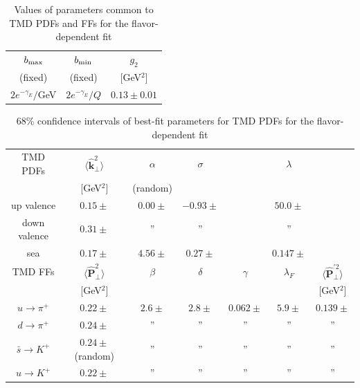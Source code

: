 \documentclass[aps,preprintnumbers,showpacs,nofootinbib,superscriptaddress,floatfix]{revtex4}
\newcommand{\T}{\perp}
\begin{document}
\begin{table}
\small
  \centering
  \begin{tabular}{|c|c|c|}
\hline
\hline
$b_{\rm max}$ & $b_{\rm min}$ &  $g_2$ 
 \\ 
 (fixed)     & (fixed)   & {[GeV$^2$]}                           \\
\hline
$2 e^{-\gamma_E}/$GeV& $2 e^{-\gamma_E}/Q$  & $0.13 \pm 0.01$  \\
\hline
\hline
\end{tabular}
\caption{Values of parameters common to TMD PDFs and FFs 
for the flavor-dependent fit}
\label{t:parcommon_flav}
\end{table}



\begin{table}
\small
  \centering
  \begin{tabular}{|c||c|c|c|c|c|c|}
\hline
\hline
TMD PDFs&  $\big \langle \hat{\bm{k}}_{\T}^2 \big \rangle$ 
& $\alpha$ & $\sigma$ & & $\lambda$ &  
 \\ 
        & {[GeV$^2$]}                               &
      (random) &      &  & & \\
\hline
up valence 
& $0.15 \pm  $ & $0.00 \pm   $ & $-0.93 \pm  $  &  & $50.0 \pm  $ &
\\
\hline
down valence 
& $0.31 \pm  $ & '' & ''  &  & '' &    \\
\hline
sea 
& $0.17 \pm  $ & $4.56 \pm   $ & $0.27 \pm  $  &  & $0.147 \pm  $ &    \\
\hline
\hline
TMD FFs&  $\big \langle \hat{\bm{P}}_{\perp}^2 \big \rangle$ &
$\beta$ & $\delta$ & $\gamma$ & $\lambda_F$ & $\big \langle
\hat{\bm{P}}_{\perp}^{\prime 2} \big \rangle$
 \\ 
        & {[GeV$^2$]} &            &         & & &{[GeV$^2$]}    \\
\hline
$u \to \pi^+$   &  $0.22 \pm $ & $2.6 \pm  $ & $2.8 \pm $ 
      & $0.062 \pm $ & $5.9 \pm $ & $0.139 \pm $  \\
\hline
$d \to \pi^+$  &  $0.24 \pm $ & '' & '' & '' & '' & ''  \\
\hline
$\bar{s} \to K^+$ &  $0.24 \pm$ (random) & '' & '' & '' & '' & ''   \\
\hline
$u \to K^+$   &  $0.22 \pm $ & '' & '' & '' & '' & ''  \\
\hline
\hline
\end{tabular}
\caption{68\% confidence intervals of 
best-fit parameters for TMD PDFs for the flavor-dependent fit}
\label{t:fd_PDFs_par_flav}
\end{table}
\end{document}
